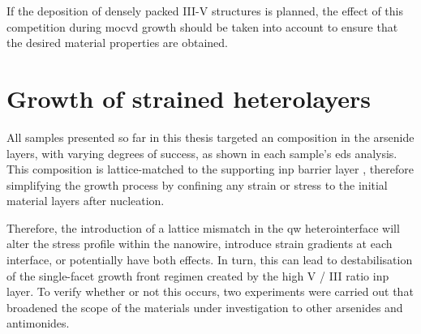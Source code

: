 If the deposition of densely packed III-V structures is planned, the effect of this competition during \acs{mocvd} growth should be taken into account to ensure that the desired material properties are obtained.

\section{Growth of strained heterolayers}

All samples presented so far in this thesis targeted an  composition in the arsenide layers, with varying degrees of success, as shown in each sample's \acs{eds} analysis. This composition is lattice-matched to the supporting \acs{inp} barrier layer \cite{Pearsall1980, Sugii1983, Wagner1970}, therefore simplifying the growth process by confining any strain or stress to the initial material layers after nucleation.

Therefore, the introduction of a lattice mismatch in the \acl{qw} heterointerface will alter the stress profile within the nanowire, introduce strain gradients at each interface, or potentially have both effects. In turn, this can lead to destabilisation of the  single-facet growth front regimen created by the high V / III ratio \acs{inp} layer. To verify whe\-ther or not this occurs, two experiments were carried out that broadened the scope of the materials under investigation to other arsenides and antimonides. 

